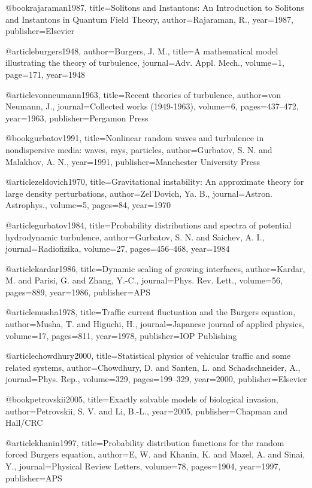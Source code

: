 @book{rajaraman1987,
  title={Solitons and Instantons: An Introduction to Solitons and Instantons in Quantum Field Theory},
  author={Rajaraman, R.},
  year={1987},
  publisher={Elsevier}
}

@article{burgers1948,
  author={Burgers, J. M.},
  title={A mathematical model illustrating the theory of turbulence},
  journal={Adv. Appl. Mech.},
  volume={1},
  page={171},
  year={1948}
}

@article{vonneumann1963,
  title={Recent theories of turbulence},
  author={von Neumann, J.},
  journal={Collected works (1949-1963)},
  volume={6},
  pages={437--472},
  year={1963},
  publisher={Pergamon Press}
}

@book{gurbatov1991,
  title={Nonlinear random waves and turbulence in nondispersive media: waves, rays, particles},
  author={Gurbatov, S. N. and Malakhov, A. N.},
  year={1991},
  publisher={Manchester University Press}
}

@article{zeldovich1970,
  title={{Gravitational instability: An approximate theory for large density perturbations}},
  author={Zel'Dovich, Ya. B.},
  journal={Astron. Astrophys.},
  volume={5},
  pages={84},
  year={1970}
}

@article{gurbatov1984,
  title={Probability distributions and spectra of potential hydrodynamic turbulence},
  author={Gurbatov, S. N. and Saichev, A. I.},
  journal={Radiofizika},
  volume={27},
  pages={456--468},
  year={1984}
}

@article{kardar1986,
  title={Dynamic scaling of growing interfaces},
  author={Kardar, M. and Parisi, G. and Zhang, Y.-C.},
  journal={Phys. Rev. Lett.},
  volume={56},
  pages={889},
  year={1986},
  publisher={APS}
}

@article{musha1978,
  title={{Traffic current fluctuation and the Burgers equation}},
  author={Musha, T. and Higuchi, H.},
  journal={Japanese journal of applied physics},
  volume={17},
  pages={811},
  year={1978},
  publisher={IOP Publishing}
}

@article{chowdhury2000,
  title={Statistical physics of vehicular traffic and some related systems},
  author={Chowdhury, D. and Santen, L. and Schadschneider, A.},
  journal={Phys. Rep.},
  volume={329},
  pages={199--329},
  year={2000},
  publisher={Elsevier}
}

@book{petrovskii2005,
  title={Exactly solvable models of biological invasion},
  author={Petrovskii, S. V. and Li, B.-L.},
  year={2005},
  publisher={Chapman and Hall/CRC}
}

@article{khanin1997,
  title={{Probability distribution functions for the random forced Burgers equation}},
  author={E, W. and Khanin, K. and Mazel, A. and Sinai, Y.},
  journal={Physical Review Letters},
  volume={78},
  pages={1904},
  year={1997},
  publisher={APS}
}

